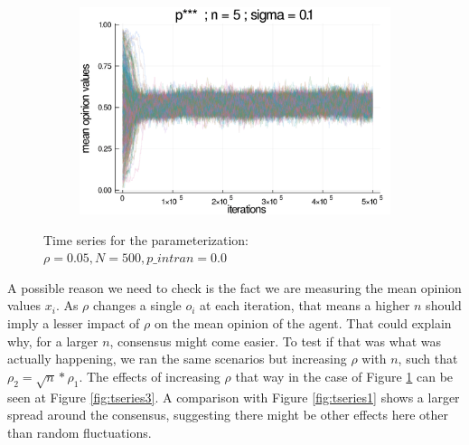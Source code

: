 \documentclass{article}
\begin{document}
\begin{figure}[H]
      \begin{subfigure}[b]{0.48\textwidth}
        \includegraphics[width=\textwidth]{img/series/tseries2/Poodlcalculatepsssn5-rho005-sigma01-00intransrandom.png}
      \end{subfigure}
      \caption{Time series for the parameterization: \(\rho = 0.05, N = 500,
        p\_intran = 0.0\)}
            \label{fig:tseries2}
          \end{figure}

          A possible reason we need to check is the fact we are measuring the
          mean opinion values \( x_i \). As \(\rho\) changes a single \(o_i\) at
          each iteration, that means a higher \(n\) should imply a lesser impact
          of \(\rho\) on the mean opinion of the agent. That could explain why,
          for a larger $n$, consensus might come easier. To test if that was
          what was actually happening, we ran the same scenarios but increasing
          \(\rho\) with \(n\), such that \(\rho_2 = \sqrt{n} * \rho_1 \). The
          effects of increasing \(\rho\) that way in the case of Figure
          \ref{fig:tseries2} can be seen at Figure \ref{fig:tseries3}. A
          comparison with Figure \ref{fig:tseries1} shows a larger spread around
          the consensus, suggesting there might be other effects here other than
          random fluctuations.
\end{document}
